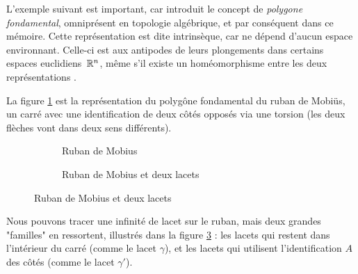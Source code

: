 L'exemple suivant est important, car introduit le concept de \emph{polygone fondamental}, omniprésent en topologie algébrique, et par conséquent dans ce mémoire. Cette représentation est dite intrinsèque, car ne dépend d'aucun espace environnant. Celle-ci est aux antipodes de leurs plongements dans certains espaces euclidiens~$\mathbb{R}^n$, même s'il existe un homéomorphisme entre les deux représentations \cite{Homeo-article}.

\begin{exemple}
La figure \ref{tkz:mobius} est la représentation du polygône fondamental du ruban de Mobiüs, un carré avec une identification de deux côtés opposés via une torsion (les deux flèches vont dans deux sens différents).
\begin{figure}[H]
\centering
\begin{subfigure}[b]{0.45\linewidth}
\centering
{}
\caption{Ruban de Mobius}
\label{tkz:mobius}
\end{subfigure}
\begin{subfigure}[b]{0.45\linewidth}
\centering
{}
\caption{Ruban de Mobius et deux lacets}
\label{tkz:mobius-loops}
\end{subfigure}
\end{figure}

Nous pouvons tracer une infinité de lacet sur le ruban, mais deux grandes "familles" en ressortent, illustrés dans la figure \ref{tkz:mobius-loops} : les lacets qui restent dans l'intérieur du carré (comme le lacet $\gamma$), et les lacets qui utilisent l'identification $A$ des côtés (comme le lacet $\gamma'$).
\end{exemple}

